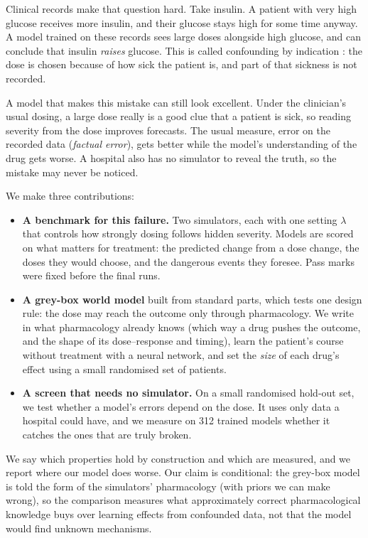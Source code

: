 \documentclass[letterpaper]{article}
\begin{document}
Clinical records make that question hard. Take insulin. A patient with very high glucose receives more insulin, and their glucose stays high for some time anyway. A model trained on these records sees large doses alongside high glucose, and can conclude that insulin \emph{raises} glucose. This is called confounding by indication \citep{kyriacou2016confounding}: the dose is chosen because of how sick the patient is, and part of that sickness is not recorded.

A model that makes this mistake can still look excellent. Under the clinician's usual dosing, a large dose really is a good clue that a patient is sick, so reading severity from the dose improves forecasts. The usual measure, error on the recorded data (\emph{factual error}), gets better while the model's understanding of the drug gets worse. A hospital also has no simulator to reveal the truth, so the mistake may never be noticed.

We make three contributions:
\begin{itemize}
\item \textbf{A benchmark for this failure.} Two simulators, each with one setting $\lambda$ that controls how strongly dosing follows hidden severity. Models are scored on what matters for treatment: the predicted change from a dose change, the doses they would choose, and the dangerous events they foresee. Pass marks were fixed before the final runs.
\item \textbf{A grey-box world model} built from standard parts, which tests one design rule: the dose may reach the outcome only through pharmacology. We write in what pharmacology already knows (which way a drug pushes the outcome, and the shape of its dose--response and timing), learn the patient's course without treatment with a neural network, and set the \emph{size} of each drug's effect using a small randomised set of patients.
\item \textbf{A screen that needs no simulator.} On a small randomised hold-out set, we test whether a model's errors depend on the dose. It uses only data a hospital could have, and we measure on 312 trained models whether it catches the ones that are truly broken.
\end{itemize}
We say which properties hold by construction and which are measured, and we report where our model does worse. Our claim is conditional: the grey-box model is told the form of the simulators' pharmacology (with priors we can make wrong), so the comparison measures what approximately correct pharmacological knowledge buys over learning effects from confounded data, not that the model would find unknown mechanisms.
\end{document}
